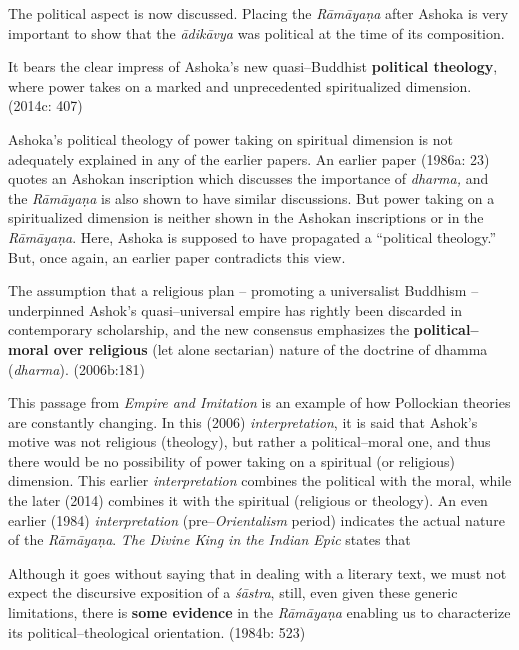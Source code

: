 The political aspect is now discussed. Placing the \textit{Rāmāyaṇa }after Ashoka is very important to show that the \textit{ādikāvya} was political at the time of its composition.

\begin{myquote}
It bears the clear impress of Ashoka’s new quasi–Buddhist \textbf{political theology}, where power takes on a marked and unprecedented spiritualized dimension. (2014c: 407)
\end{myquote}

Ashoka’s political theology of power taking on spiritual dimension is not adequately explained in any of the earlier papers. An earlier paper (1986a: 23) quotes an Ashokan inscription which discusses the importance of \textit{dharma,} and the \textit{Rāmāyaṇa }is also shown to have similar discussions. But power taking on a spiritualized dimension is neither shown in the Ashokan inscriptions or in the \textit{Rāmāyaṇa}. Here, Ashoka is supposed to have propagated a “political theology.” But, once again, an earlier paper contradicts this view.

\begin{myquote}
The assumption that a religious plan – promoting a universalist Buddhism – underpinned Ashok’s quasi–universal empire has rightly been discarded in contemporary scholarship, and the new consensus emphasizes the \textbf{political–moral over religious} (let alone sectarian) nature of the doctrine of dhamma (\textit{dharma}). (2006b:181)
\end{myquote}

This passage from \textit{Empire and Imitation} is an example of how Pollockian theories are constantly changing. In this (2006) \textit{interpretation}, it is said that Ashok’s motive was not religious (theology), but rather a political–moral one, and thus there would be no possibility of power taking on a spiritual (or religious) dimension. This earlier \textit{interpretation} combines the political with the moral, while the later (2014) combines it with the spiritual (religious or theology). An even earlier (1984) \textit{interpretation} (pre–\textit{Orientalism} period) indicates the actual nature of the \textit{Rāmāyaṇa}. \textit{The Divine King in the Indian Epic} states that

\begin{myquote}
Although it goes without saying that in dealing with a literary text, we must not expect the discursive exposition of a \textit{śāstra}, still, even given these generic limitations, there is \textbf{some evidence} in the \textit{Rāmāyaṇa} enabling us to characterize its political–theological orientation. (1984b: 523)
\end{myquote}

